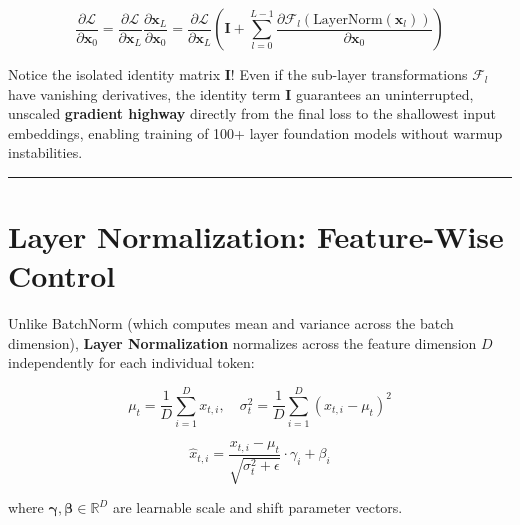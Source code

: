 \documentclass[
  letterpaper,
]{scrbook}
\begin{document}
\[\frac{\partial \mathcal{L}}{\partial \mathbf{x}_0} = \frac{\partial \mathcal{L}}{\partial \mathbf{x}_L} \frac{\partial \mathbf{x}_L}{\partial \mathbf{x}_0} = \frac{\partial \mathcal{L}}{\partial \mathbf{x}_L} \left( \mathbf{I} + \sum_{l=0}^{L-1} \frac{\partial \mathcal{F}_l(\text{LayerNorm}(\mathbf{x}_l))}{\partial \mathbf{x}_0} \right)\]

Notice the isolated identity matrix \(\mathbf{I}\)! Even if the
sub-layer transformations \(\mathcal{F}_l\) have vanishing derivatives,
the identity term \(\mathbf{I}\) guarantees an uninterrupted, unscaled
\textbf{gradient highway} directly from the final loss to the shallowest
input embeddings, enabling training of 100+ layer foundation models
without warmup instabilities.

\begin{center}\rule{0.5\linewidth}{0.5pt}\end{center}

\section{Layer Normalization: Feature-Wise
Control}\label{layer-normalization-feature-wise-control}

Unlike BatchNorm (which computes mean and variance across the batch
dimension), \textbf{Layer Normalization} normalizes across the feature
dimension \(D\) independently for each individual token:

\[\mu_t = \frac{1}{D} \sum_{i=1}^D x_{t, i}, \quad \sigma_t^2 = \frac{1}{D} \sum_{i=1}^D (x_{t, i} - \mu_t)^2\]

\[\hat{x}_{t, i} = \frac{x_{t, i} - \mu_t}{\sqrt{\sigma_t^2 + \epsilon}} \cdot \gamma_i + \beta_i\]

where \(\mathbf{\gamma}, \mathbf{\beta} \in \mathbb{R}^D\) are learnable
scale and shift parameter vectors.
\end{document}
